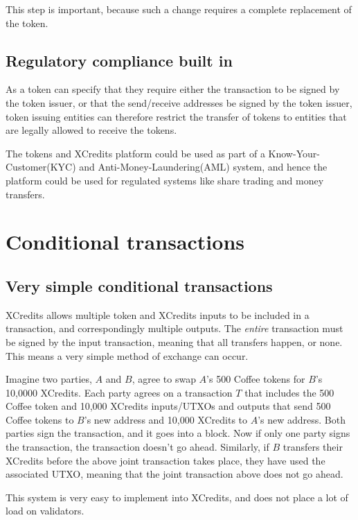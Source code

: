 \documentclass[a4paper,12pt]{article}
\begin{document}
This step is important, because such a change requires a complete replacement of the token. 

\subsection{Regulatory compliance built in}
As a token can specify that they require either the transaction to be signed by the token issuer, or that the send/receive addresses be signed by the token issuer, token issuing entities can therefore restrict the transfer of tokens to entities that are legally allowed to receive the tokens. 

The tokens and XCredits platform could be used as part of a Know-Your-Customer(KYC) and Anti-Money-Laundering(AML) system, and hence the platform could be used for regulated systems like share trading and money transfers. 






\section{Conditional transactions}

\subsection{Very simple conditional transactions}
XCredits allows multiple token and XCredits inputs to be included in a transaction, and correspondingly multiple outputs. The \textit{entire} transaction must be signed by the input transaction, meaning that all transfers happen, or none. This means a very simple method of exchange can occur.

Imagine two parties, $A$ and $B$, agree to swap $A$'s 500 Coffee tokens for $B$'s 10,0000 XCredits. Each party agrees on a transaction $T$ that includes the 500 Coffee token and 10,000 XCredits inputs/UTXOs and outputs that send 500 Coffee tokens to $B$'s new address and 10,000 XCredits to $A$'s new address. Both parties sign the transaction, and it goes into a block. Now if only one party signs the transaction, the transaction doesn't go ahead. Similarly, if $B$ transfers their XCredits before the above joint transaction takes place, they have used the associated UTXO, meaning that the joint transaction above does not go ahead. 

This system is very easy to implement into XCredits, and does not place a lot of load on validators. 
\end{document}

